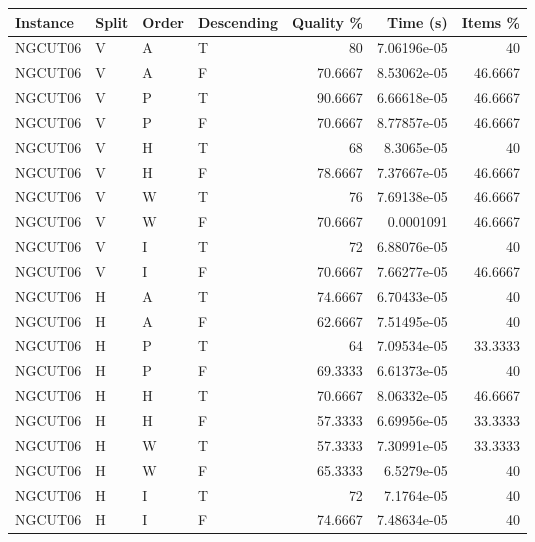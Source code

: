 \begin{tabular}{llllrrr}
    \hline
    Instance & Split & Order & Descending & Quality \% & Time (s)    & Items \% \\
    \hline
    NGCUT06  & V     & A     & T          & 80         & 7.06196e-05 & 40       \\
    NGCUT06  & V     & A     & F          & 70.6667    & 8.53062e-05 & 46.6667  \\
    NGCUT06  & V     & P     & T          & 90.6667    & 6.66618e-05 & 46.6667  \\
    NGCUT06  & V     & P     & F          & 70.6667    & 8.77857e-05 & 46.6667  \\
    NGCUT06  & V     & H     & T          & 68         & 8.3065e-05  & 40       \\
    NGCUT06  & V     & H     & F          & 78.6667    & 7.37667e-05 & 46.6667  \\
    NGCUT06  & V     & W     & T          & 76         & 7.69138e-05 & 46.6667  \\
    NGCUT06  & V     & W     & F          & 70.6667    & 0.0001091   & 46.6667  \\
    NGCUT06  & V     & I     & T          & 72         & 6.88076e-05 & 40       \\
    NGCUT06  & V     & I     & F          & 70.6667    & 7.66277e-05 & 46.6667  \\
    NGCUT06  & H     & A     & T          & 74.6667    & 6.70433e-05 & 40       \\
    NGCUT06  & H     & A     & F          & 62.6667    & 7.51495e-05 & 40       \\
    NGCUT06  & H     & P     & T          & 64         & 7.09534e-05 & 33.3333  \\
    NGCUT06  & H     & P     & F          & 69.3333    & 6.61373e-05 & 40       \\
    NGCUT06  & H     & H     & T          & 70.6667    & 8.06332e-05 & 46.6667  \\
    NGCUT06  & H     & H     & F          & 57.3333    & 6.69956e-05 & 33.3333  \\
    NGCUT06  & H     & W     & T          & 57.3333    & 7.30991e-05 & 33.3333  \\
    NGCUT06  & H     & W     & F          & 65.3333    & 6.5279e-05  & 40       \\
    NGCUT06  & H     & I     & T          & 72         & 7.1764e-05  & 40       \\
    NGCUT06  & H     & I     & F          & 74.6667    & 7.48634e-05 & 40       \\

\end{tabular}
